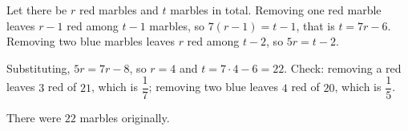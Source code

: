 Let there be $r$ red marbles and $t$ marbles in total. Removing one red marble leaves $r-1$ red among $t-1$ marbles, so $7(r-1)=t-1$, that is $t=7r-6$. Removing two blue marbles leaves $r$ red among $t-2$, so $5r=t-2$.

Substituting, $5r=7r-8$, so $r=4$ and $t=7\cdot4-6=22$. Check: removing a red leaves $3$ red of $21$, which is $\dfrac{1}{7}$; removing two blue leaves $4$ red of $20$, which is $\dfrac{1}{5}$.

There were $\boxed{22}$ marbles originally.
